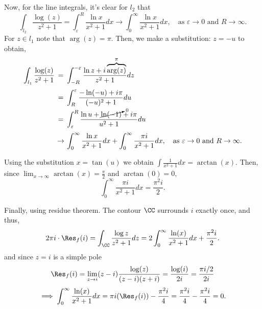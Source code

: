 Now, for the line integrals, it's clear for $l_2$ that
\[ \int_{l_2} \frac{\log(z)}{z^2 + 1} = \int_{\varepsilon}^{R} \frac{\ln x}{x^2 + 1}dx \to \int_{0}^{\infty}\frac{\ln x}{x^2 + 1}dx ,\hspace{1em} \mbox{as $\varepsilon\to 0$ and $R \to \infty$}. \]
For $z\in l_1$ note that $\arg(z) = \pi$. Then, we make a substitution: $z = -u$ to obtain,
\[ \everymath{\displaystyle}
\arraycolsep=1.8pt\def\arraystretch{2.5}
\begin{array}{rcl}
    \int_{l_1} \frac{\log(z)}{z^2 + 1} & = & \int_{-R}^{-\varepsilon} \frac{\ln z + i\overbrace{\arg(z)}^{\pi}}{z^2 + 1}dz\\
    & = & \int_{R}^{\varepsilon} \frac{-\ln(-u) + i\pi}{(-u)^2 + 1}du\\
    & = & \int_{\varepsilon}^{R} \frac{\ln u + \cancelto{0}{\ln(-1)} + i\pi}{u^2 + 1} du\\
    & \to & \int_{0}^{\infty}\frac{\ln x}{x^2 + 1}dx + \int_{0}^{\infty}\frac{\pi i}{x^2 + 1}dx  ,\hspace{1em} \mbox{as $\varepsilon\to 0$ and $R \to \infty$}.
\end{array} \]

Using the substitution $x = \tan(u)$ we obtain $\displaystyle\int \frac{1}{x^2 + 1} dx = \arctan(x)$. Then, since $\lim_{x\to \infty} \arctan(x) = \frac{\pi}{2}$ and $\arctan(0) = 0$,
\[  \int_{0}^{\infty}\frac{\pi i}{x^2 + 1}dx = \frac{\pi^2 i}{2}.\]

Finally, using residue theorem. The contour $\CC$ surrounds $i$ exactly once, and thus,
\[ 2\pi i \cdot \Res_f(i) = \int_{\CC} \frac{\log z}{z^2 + 1} dz = 2 \int_{0}^{\infty} \frac{\ln(x)}{x^2 + 1} dx + \frac{\pi^2 i}{2}.\]
and since $z = i$ is a simple pole
\[ \Res_f(i) = \lim_{z\to i} (z-i)\frac{\log(z)}{(z-i)(z+i)} = \frac{\log(i)}{2i} = \frac{\pi i/2}{2i} \]
\[ \implies  \int_{0}^{\infty} \frac{\ln(x)}{x^2 + 1} dx = \pi i(\Res_f(i)) - \frac{\pi^2 i}{4} = \frac{\pi^2 i}{4} - \frac{\pi^2 i}{4} = 0.\]